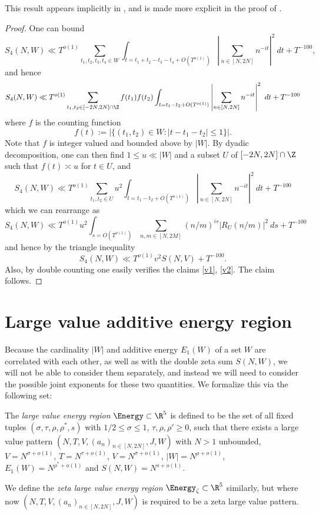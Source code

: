 This result appears implicitly in \cite[p. 229]{heath_brown_consecutive_II}, and is made more explicit in the proof of \cite[Lemma 11.6]{guth-maynard}.

\begin{proof} One can bound
    $$ S_4(N,W) \ll T^{o(1)} \sum_{t_1,t_2,t_3,t_4 \in W} \int_{t = t_1+t_2-t_3-t_4+O(T^{o(1)})} \left|\sum_{n \in [N,2N]} n^{-it}\right|^2\ dt + T^{-100},$$
    and hence
    $$ S_4(N,W) \ll T^{o(1)} \sum_{t_1,t_2 \in [-2N,2N] \cap \Z} f(t_1) f(t_2) \int_{t = t_1-t_2+O(T^{o(1)})} \left|\sum_{n \in [N,2N]} n^{-it}\right|^2\ dt + T^{-100}$$
where $f$ is the counting function
$$ f(t) := |\{ (t_1,t_2) \in W: |t-t_1-t_2| \leq 1 \}|.$$
Note that $f$ is integer valued and bounded above by $|W|$. By dyadic decomposition, one can then find $1 \leq u \ll |W|$ and a subset $U$ of $[-2N,2N] \cap \Z$ such that $f(t) \asymp u$ for $t \in U$, and
$$ S_4(N,W) \ll T^{o(1)} \sum_{t_1,t_2 \in U} u^2 \int_{t = t_1-t_2+O(T^{o(1)})} \left|\sum_{n \in [N,2N]} n^{-it} \right|^2\ dt + T^{-100}$$
which we can rearrange as
$$ S_4(N,W) \ll T^{o(1)} u^2 \int_{s = O(T^{o(1)})} \sum_{n,m \in [N,2M]} (n/m)^{is} |R_U(n/m)|^2\ ds + T^{-100}$$
and hence by the triangle inequality
$$ S_4(N,W) \ll T^{o(1)} v^2 S(N,V) + T^{-100}.$$
Also, by double counting one easily verifies the claims \eqref{v1}, \eqref{v2}.  The claim follows.
\end{proof}


\section{Large value additive energy region}

Because the cardinality $|W|$ and additive energy $E_1(W)$ of a set $W$ are correlated with each other, as well as with the double zeta sum $S(N,W)$, we will not be able to consider them separately, and instead we will need to consider the possible joint exponents for these two quantities.  We formalize this via the following set:

\begin{definition}\label{lv-edef} The \emph{large value energy region} $\Energy \subset \R^5$ is defined to be the set of all fixed tuples $(\sigma,\tau,\rho,\rho^*,s)$ with $1/2 \leq \sigma \leq 1$, $\tau, \rho, \rho' \geq 0$, such that there exists a large value pattern $(N,T,V,(a_n)_{n \in [N,2N]},J,W)$ with $N>1$ unbounded, $V = N^{\sigma+o(1)}$, $T = N^{\tau+o(1)}$, $V = N^{\sigma+o(1)}$, $|W| = N^{\rho+o(1)}$, $E_1(W) = N^{\rho^*+o(1)}$ and $S(N,W) = N^{s+o(1)}$.

We define the \emph{zeta large value energy region} $\Energy_\zeta \subset \R^5$ similarly, but where now $(N,T,V,(a_n)_{n \in [N,2N]},J,W)$ is required to be a zeta large value pattern.
\end{definition}

